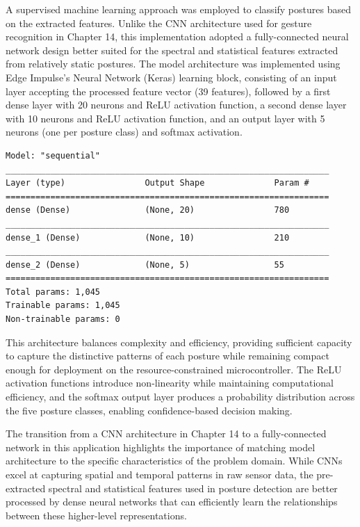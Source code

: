 \documentclass[
  9pt,
  letterpaper,
  abstract,
  titlepage]{scrbook}
\begin{document}
A supervised machine learning approach was employed to classify postures
based on the extracted features. Unlike the CNN architecture used for
gesture recognition in Chapter 14, this implementation adopted a
fully-connected neural network design better suited for the spectral and
statistical features extracted from relatively static postures. The
model architecture was implemented using Edge Impulse's Neural Network
(Keras) learning block, consisting of an input layer accepting the
processed feature vector (39 features), followed by a first dense layer
with 20 neurons and ReLU activation function, a second dense layer with
10 neurons and ReLU activation function, and an output layer with 5
neurons (one per posture class) and softmax activation.

\begin{verbatim}
Model: "sequential"
_________________________________________________________________
Layer (type)                Output Shape              Param #
=================================================================
dense (Dense)               (None, 20)                780
_________________________________________________________________
dense_1 (Dense)             (None, 10)                210
_________________________________________________________________
dense_2 (Dense)             (None, 5)                 55
=================================================================
Total params: 1,045
Trainable params: 1,045
Non-trainable params: 0
\end{verbatim}

This architecture balances complexity and efficiency, providing
sufficient capacity to capture the distinctive patterns of each posture
while remaining compact enough for deployment on the
resource-constrained microcontroller. The ReLU activation functions
introduce non-linearity while maintaining computational efficiency, and
the softmax output layer produces a probability distribution across the
five posture classes, enabling confidence-based decision making.

The transition from a CNN architecture in Chapter 14 to a
fully-connected network in this application highlights the importance of
matching model architecture to the specific characteristics of the
problem domain. While CNNs excel at capturing spatial and temporal
patterns in raw sensor data, the pre-extracted spectral and statistical
features used in posture detection are better processed by dense neural
networks that can efficiently learn the relationships between these
higher-level representations.
\end{document}
